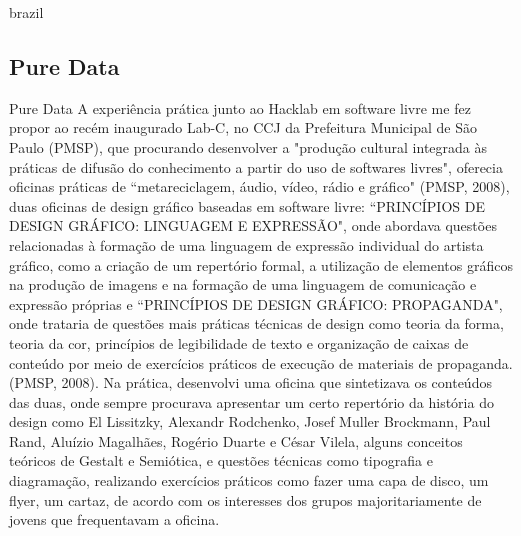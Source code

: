 \begin{otherlanguage*}{brazil}
\subsection{Pure Data}

Pure Data
A experiência prática junto ao Hacklab em software livre me fez propor ao recém inaugurado Lab-C, no CCJ da Prefeitura Municipal de São Paulo (PMSP), que procurando desenvolver a "produção cultural integrada às práticas de difusão do conhecimento a partir do uso de softwares livres", oferecia oficinas práticas de ``metareciclagem, áudio, vídeo, rádio e gráfico" (PMSP, 2008), duas oficinas de design gráfico baseadas em software livre: ``PRINCÍPIOS DE DESIGN GRÁFICO: LINGUAGEM E EXPRESSÃO", onde abordava questões relacionadas à formação de uma linguagem de expressão individual do artista gráfico, como a criação de um repertório formal, a utilização de elementos gráficos na produção de imagens e na formação de uma linguagem de comunicação e expressão próprias e ``PRINCÍPIOS DE DESIGN GRÁFICO: PROPAGANDA",  onde trataria de  questões mais práticas técnicas de design como teoria da forma, teoria da cor, princípios de legibilidade de texto e organização de caixas de conteúdo por meio de exercícios práticos de execução de materiais de propaganda. (PMSP, 2008). 
Na prática, desenvolvi uma oficina que sintetizava os conteúdos das duas, onde sempre procurava apresentar um certo repertório da história do design como El Lissitzky, Alexandr Rodchenko, Josef Muller Brockmann, Paul Rand, Aluízio Magalhães, Rogério Duarte e César Vilela, alguns conceitos teóricos de Gestalt e Semiótica, e questões técnicas como tipografia e diagramação, realizando exercícios práticos como fazer uma capa de disco, um flyer, um cartaz, de acordo com os interesses dos grupos majoritariamente de jovens que frequentavam a oficina. 


\end{otherlanguage*}
